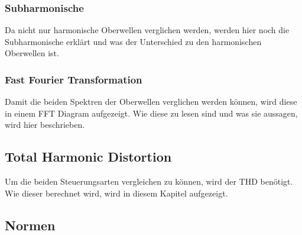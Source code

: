 \subsubsection{Subharmonische}
Da nicht nur harmonische Oberwellen verglichen werden, werden hier noch die Subharmonische erklärt und was der Unterschied zu den harmonischen Oberwellen ist. 
\subsubsection{Fast Fourier Transformation}
Damit die beiden Spektren der Oberwellen verglichen werden können, wird diese in einem FFT Diagram aufgezeigt. Wie diese zu lesen sind und was sie aussagen, wird hier beschrieben. 

\subsection{Total Harmonic Distortion}
Um die beiden Steuerungsarten vergleichen zu können, wird der THD benötigt. Wie dieser berechnet wird, wird in diesem Kapitel aufgezeigt. 


\subsection{Normen}

